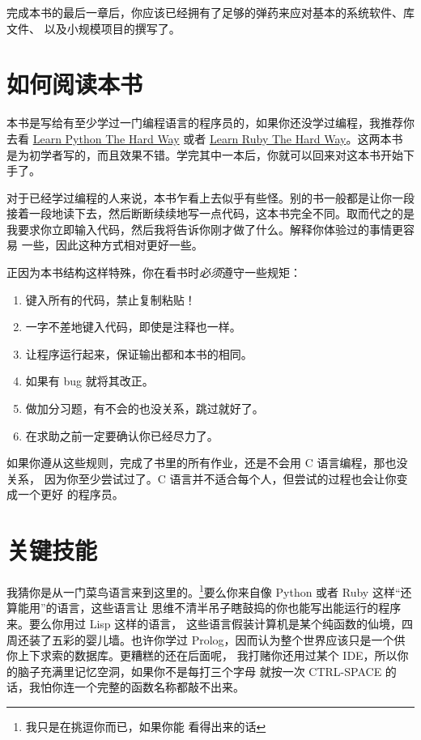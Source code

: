 完成本书的最后一章后，你应该已经拥有了足够的弹药来应对基本的系统软件、库文件、
以及小规模项目的撰写了。


\section*{如何阅读本书}

本书是写给有至少学过一门编程语言的程序员的，如果你还没学过编程，我推荐你去看
\href{http://learnpythonthehardway.org}{Learn Python The Hard Way} 或者
\href{http://ruby.learncodethehardway.org}{Learn Ruby The Hard Way}。这两本书
是为初学者写的，而且效果不错。学完其中一本后，你就可以回来对这本书开始下手了。

对于已经学过编程的人来说，本书乍看上去似乎有些怪。别的书一般都是让你一段
接着一段地读下去，然后断断续续地写一点代码，这本书完全不同。取而代之的是
我要求你立即输入代码，然后我将告诉你刚才做了什么。解释你体验过的事情更容易
一些，因此这种方式相对更好一些。

正因为本书结构这样特殊，你在看书时\emph{必须}遵守一些规矩：

\begin{enumerate}
\item 键入所有的代码，禁止复制粘贴！
\item 一字不差地键入代码，即使是注释也一样。
\item 让程序运行起来，保证输出都和本书的相同。
\item 如果有 bug 就将其改正。
\item 做加分习题，有不会的也没关系，跳过就好了。
\item 在求助之前一定要确认你已经尽力了。
\end{enumerate}

如果你遵从这些规则，完成了书里的所有作业，还是不会用 C 语言编程，那也没关系，
因为你至少尝试过了。C 语言并不适合每个人，但尝试的过程也会让你变成一个更好
的程序员。

\section*{关键技能}

我猜你是从一门菜鸟语言来到这里的。\footnote{我只是在挑逗你而已，如果你能
看得出来的话}要么你来自像 Python 或者 Ruby 这样“还算能用”的语言，这些语言让
思维不清半吊子瞎鼓捣的你也能写出能运行的程序来。要么你用过 Lisp 这样的语言，
这些语言假装计算机是某个纯函数的仙境，四周还装了五彩的婴儿墙。也许你学过
Prolog，因而认为整个世界应该只是一个供你上下求索的数据库。更糟糕的还在后面呢，
我打赌你还用过某个 IDE，所以你的脑子充满里记忆空洞，如果你不是每打三个字母
就按一次 CTRL-SPACE 的话，我怕你连一个完整的函数名称都敲不出来。

